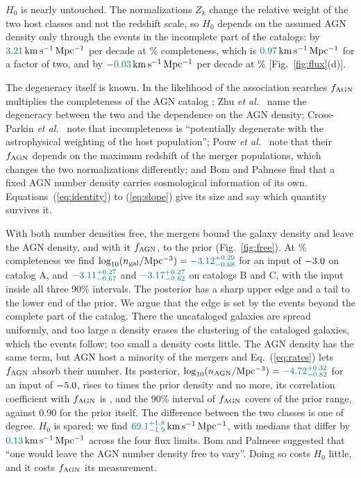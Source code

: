 \documentclass[aps,prd,reprint,twocolumn,superscriptaddress,nofootinbib,floatfix]{revtex4-2}
\newcommand{\kms}{{\rm km\,s^{-1}\,Mpc^{-1}}}
\newcommand{\fagn}{f_{\rm AGN}}
\newcommand{\ngal}{n_{\rm gal}}
\newcommand{\nagn}{n_{\rm AGN}}
\providecommand{\FreeLognAGNPeakOverPrior}{\ph{X.X}}   %
\begin{document}
$H_0$ is nearly untouched. The normalizations $Z_k$ change the relative
weight of the two host classes and not the redshift scale, so $H_0$ depends
on the assumed AGN density only through the events in the incomplete part of
the catalogs: by $\SlopeHzeroEighteen\,\kms$ per decade at
\MockCompEighteen\% completeness, which is $\DeltaHzeroTwoEighteen\,\kms$
for a factor of two, and by $\SlopeHzeroTwenty\,\kms$ per decade at
\MockCompTwenty\% [Fig.~\ref{fig:flux}(d)].

The degeneracy itself is known. In the likelihood of the association
searches $\fagn$ multiplies the completeness of the AGN catalog
\cite{Zhu:2025rdv}; Zhu \textit{et al.}~\cite{Zhu:2024qpp} name the
degeneracy between the two and the dependence on the AGN density;
Cross-Parkin \textit{et al.}~\cite{Cross-Parkin:2026pua} note that
incompleteness is ``potentially degenerate with the astrophysical weighting
of the host population''; Pouw \textit{et al.}~\cite{Pouw:2026lar} note that
their $\fagn$ depends on the maximum redshift of the merger populations,
which changes the two normalizations differently; and Bom and Palmese
\cite{Bom:2023zgw} find that a fixed AGN number density carries cosmological
information of its own. Equations~(\ref{eq:identity}) to
(\ref{eq:slope}) give its size and say which quantity survives it.

With both number densities free, the mergers bound the galaxy density and
leave the AGN density, and with it $\fagn$, to the prior
(Fig.~\ref{fig:free}). At \MockCompEighteen\% completeness we find
$\log_{10}(\ngal/{\rm Mpc^{-3}})=\FreeLognGalEighteen$ for an input of
$-3.0$ on catalog A, and $\FreeLognGalEighteenCatB$ and
$\FreeLognGalEighteenCatC$ on catalogs B and C, with the input inside all
three 90\% intervals. The posterior has a sharp upper edge and a tail to the
lower end of the prior. We argue that the edge is set by the events beyond the
complete part of the catalog. There the uncataloged galaxies are spread
uniformly, and too large a density erases the clustering of the cataloged
galaxies, which the events follow; too small a density costs little. The AGN density
has the same term, but AGN host a minority of the mergers and
Eq.~(\ref{eq:rates}) lets $\fagn$ absorb their number. Its posterior,
$\log_{10}(\nagn/{\rm Mpc^{-3}})=\FreeLognAGNEighteen$ for an input of
$-5.0$, rises to \FreeLognAGNPeakOverPrior{} times the prior density
and no more, its correlation coefficient with $\fagn$ is
\FreeRhofAGNEighteen, and the 90\% interval of $\fagn$ covers
\FreefWidthEighteen{} of the prior range, against 0.90 for the prior itself.
The difference between the two classes is one of degree. $H_0$ is spared: we
find $\FreeHzeroEighteen\,\kms$, with medians that differ by
$\FreeHzeroSpread\,\kms$ across the four flux limits. Bom and Palmese
\cite{Bom:2023zgw} suggested that ``one would leave the AGN number density
free to vary''. Doing so costs $H_0$ little, and it costs $\fagn$ its
measurement.
\end{document}
